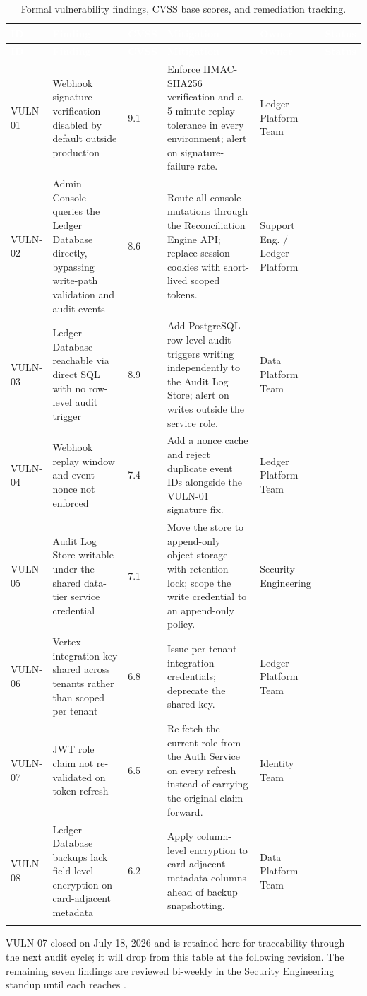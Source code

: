 {\footnotesize
\setlength{\tabcolsep}{3pt}
\begin{longtable}{@{}P{13mm}P{35mm}P{10mm}P{48mm}P{22mm}c@{}}
\toprule
{}
\textcolor{white}{\textbf{ID}} & \textcolor{white}{\textbf{Finding}} & \textcolor{white}{\textbf{CVSS}} & \textcolor{white}{\textbf{Mitigation}} & \textcolor{white}{\textbf{Owner}} & \textcolor{white}{\textbf{Status}} \\
\midrule
\endfirsthead
\toprule
{}
\textcolor{white}{\textbf{ID}} & \textcolor{white}{\textbf{Finding}} & \textcolor{white}{\textbf{CVSS}} & \textcolor{white}{\textbf{Mitigation}} & \textcolor{white}{\textbf{Owner}} & \textcolor{white}{\textbf{Status}} \\
\midrule
\endhead
VULN-01 & Webhook signature verification disabled by default outside production & 9.1 & Enforce HMAC-SHA256 verification and a 5-minute replay tolerance in every environment; alert on signature-failure rate. & Ledger Platform Team & \stprogress{} \\
VULN-02 & Admin Console queries the Ledger Database directly, bypassing write-path validation and audit events & 8.6 & Route all console mutations through the Reconciliation Engine API; replace session cookies with short-lived scoped tokens. & Support Eng. / Ledger Platform & \stopen{} \\
VULN-03 & Ledger Database reachable via direct SQL with no row-level audit trigger & 8.9 & Add PostgreSQL row-level audit triggers writing independently to the Audit Log Store; alert on writes outside the service role. & Data Platform Team & \stprogress{} \\
VULN-04 & Webhook replay window and event nonce not enforced & 7.4 & Add a nonce cache and reject duplicate event IDs alongside the VULN-01 signature fix. & Ledger Platform Team & \stprogress{} \\
VULN-05 & Audit Log Store writable under the shared data-tier service credential & 7.1 & Move the store to append-only object storage with retention lock; scope the write credential to an append-only policy. & Security Engineering & \stopen{} \\
VULN-06 & Vertex integration key shared across tenants rather than scoped per tenant & 6.8 & Issue per-tenant integration credentials; deprecate the shared key. & Ledger Platform Team & \stopen{} \\
VULN-07 & JWT role claim not re-validated on token refresh & 6.5 & Re-fetch the current role from the Auth Service on every refresh instead of carrying the original claim forward. & Identity Team & \stdone{} \\
VULN-08 & Ledger Database backups lack field-level encryption on card-adjacent metadata & 6.2 & Apply column-level encryption to card-adjacent metadata columns ahead of backup snapshotting. & Data Platform Team & \stopen{} \\
\bottomrule
\caption{Formal vulnerability findings, CVSS base scores, and remediation tracking.}
\label{tab:findings}
\end{longtable}
}

VULN-07 closed on July 18, 2026 and is retained here for traceability through the next audit cycle; it will drop from this table at the following revision. The remaining seven findings are reviewed bi-weekly in the Security Engineering standup until each reaches \stdone{}.
